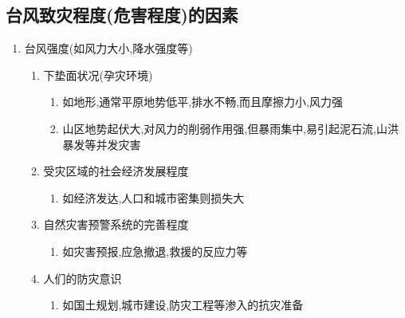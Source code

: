 \documentclass[a4paper]{article}
\begin{document}
    \subsection{台风致灾程度(危害程度)的因素}
    \begin{enumerate}
        \item 台风强度(如风力大小,降水强度等)
        \begin{enumerate}
            \item 下垫面状况(孕灾环境)
            \begin{enumerate}
                \item 如地形,通常平原地势低平,排水不畅,而且摩擦力小,风力强
                \item 山区地势起伏大,对风力的削弱作用强,但暴雨集中,易引起泥石流,山洪暴发等并发灾害
            \end{enumerate}
            \item 受灾区域的社会经济发展程度
            \begin{enumerate}
                \item 如经济发达,人口和城市密集则损失大
            \end{enumerate}
            \item 自然灾害预警系统的完善程度
            \begin{enumerate}
                \item 如灾害预报,应急撤退,救援的反应力等
            \end{enumerate}
            \item 人们的防灾意识
            \begin{enumerate}
                \item 如国土规划,城市建设,防灾工程等渗入的抗灾准备
            \end{enumerate}
        \end{enumerate}
    \end{enumerate}
\end{document}
